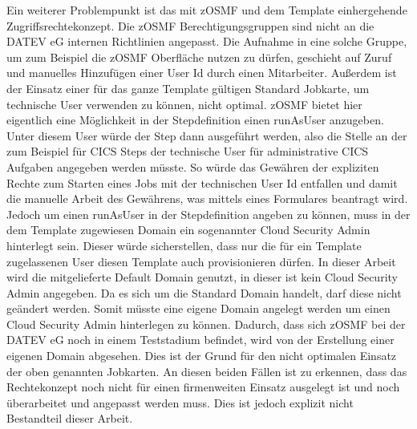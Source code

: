 Ein weiterer Problempunkt ist das mit zOSMF und dem Template einhergehende Zugriffsrechtekonzept.
Die zOSMF Berechtigungsgruppen sind nicht an die DATEV eG internen Richtlinien angepasst.
Die Aufnahme in eine solche Gruppe, um zum Beispiel die zOSMF Oberfläche nutzen zu dürfen, geschieht auf Zuruf und manuelles Hinzufügen einer User Id durch einen Mitarbeiter.
Außerdem ist der Einsatz einer für das ganze Template gültigen Standard Jobkarte, um technische User verwenden zu können, nicht optimal.
zOSMF bietet hier eigentlich eine Möglichkeit in der Stepdefinition einen \glqq runAsUser\grqq{} anzugeben.
Unter diesem User würde der Step dann ausgeführt werden, also die Stelle an der zum Beispiel für CICS Steps der technische User für administrative CICS Aufgaben angegeben werden müsste.
So würde das Gewähren der expliziten Rechte zum Starten eines Jobs mit der technischen User Id entfallen und damit die manuelle Arbeit des \glqq Gewährens\grqq, was mittels eines Formulares beantragt wird.
Jedoch um einen \glqq runAsUser\grqq{} in der Stepdefinition angeben zu können, muss in der dem Template zugewiesen \glqq Domain\grqq{} ein sogenannter \glqq Cloud Security Admin\grqq{} hinterlegt sein.
Dieser würde sicherstellen, dass nur die für ein Template zugelassenen User diesen Template auch provisionieren dürfen.
In dieser Arbeit wird die mitgelieferte \glqq Default Domain\grqq{} genutzt, in dieser ist kein \glqq Cloud Security Admin\grqq{} angegeben.
Da es sich um die Standard \glqq Domain\grqq{} handelt, darf diese nicht geändert werden.
Somit müsste eine eigene \glqq Domain\grqq{} angelegt werden um einen \glqq Cloud Security Admin\grqq{} hinterlegen zu können.
Dadurch, dass sich zOSMF bei der DATEV eG noch in einem Teststadium befindet, wird von der Erstellung einer eigenen \glqq Domain\grqq{} abgesehen.
Dies ist der Grund für den nicht optimalen Einsatz der oben genannten Jobkarten.
An diesen beiden Fällen ist zu erkennen, dass das Rechtekonzept noch nicht für einen firmenweiten Einsatz ausgelegt ist und noch überarbeitet und angepasst werden muss.
Dies ist jedoch explizit nicht Bestandteil dieser Arbeit.


 
